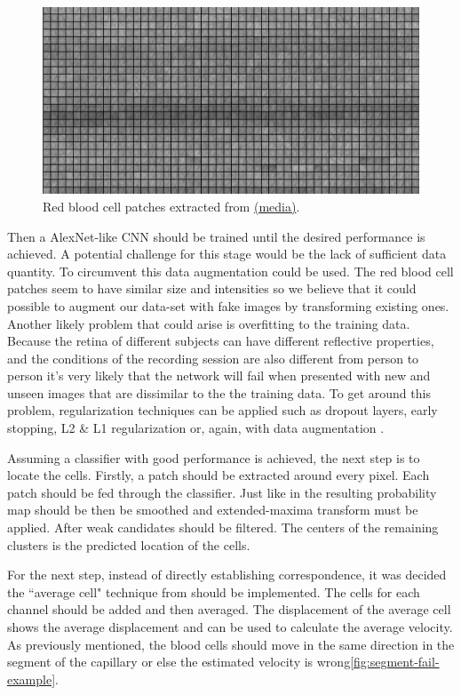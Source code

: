 \documentclass[]{article}
\begin{document}
\begin{figure}[ht]
	\centering
	\includegraphics[width=\textwidth]{extracting_data_own.png}
	\caption{Red blood cell patches extracted from \href{https://youtu.be/-7ew5sqOaTo}{(media)}. }
	\label{fig:own-data-blood-cells}
\end{figure}

Then a AlexNet\cite{krizhevsky_imagenet_2012}-like CNN should be trained until the desired performance is achieved.
A potential challenge for this stage would be the lack of sufficient data quantity.
To circumvent this data augmentation could be used.
The red blood cell patches seem to have similar size and intensities so we believe that it could possible to augment our data-set with fake images by transforming existing ones.
Another likely problem that could arise is overfitting to the training data.
Because the retina of different subjects can have different reflective properties, and the conditions of the recording session are also different from
person to person it's very likely that the network will fail when presented with
new and unseen images that are dissimilar to the the training data.
To get around this problem, regularization techniques can be applied such as dropout layers, early stopping, L2 \& L1 regularization\cite{Goodfellow-et-al-2016} or, again, with data augmentation\cite{Goodfellow-et-al-2016} . 

Assuming a classifier with good performance is achieved, the next step is to 
locate the cells.
Firstly, a patch should be extracted around every pixel. Each patch should be 
fed through the classifier.
Just like in \cite{cunefare_open_2017} the resulting probability map should be then be smoothed and extended-maxima transform must be applied.
After weak candidates should be filtered.
The centers of the remaining clusters is the predicted location of the cells.

For the next step, instead of directly establishing correspondence,
it was decided the ``average cell" technique from\cite{castro_rapid_2016}
should be implemented.
The cells for each channel should be added and then averaged.
The displacement of the average cell shows the average displacement 
and can be used to calculate the average velocity.
As previously mentioned, the blood cells should move in the same direction in the segment of the capillary or else the estimated velocity is wrong\ref{fig:segment-fail-example}.
\end{document}
